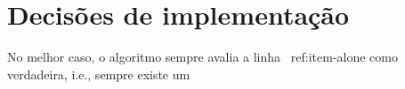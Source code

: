 \section{Decisões de implementação}
\label{sec:decisoes}

No melhor caso, o algoritmo sempre avalia a linha ~{ref:item-alone} como verdadeira, i.e., sempre existe um 